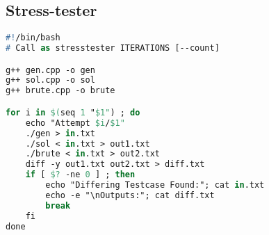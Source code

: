 \subsection*{Stress-tester}
\begin{lstlisting}[language= Pascal, commentstyle=\color{black}, numberstyle=\tiny\color{black}, keywordstyle=\color{black}, stringstyle=\color{black},
]
#!/bin/bash
# Call as stresstester ITERATIONS [--count]

g++ gen.cpp -o gen
g++ sol.cpp -o sol
g++ brute.cpp -o brute

for i in $(seq 1 "$1") ; do
    echo "Attempt $i/$1"
    ./gen > in.txt
    ./sol < in.txt > out1.txt
    ./brute < in.txt > out2.txt
    diff -y out1.txt out2.txt > diff.txt
    if [ $? -ne 0 ] ; then
        echo "Differing Testcase Found:"; cat in.txt
        echo -e "\nOutputs:"; cat diff.txt
        break
    fi
done
\end{lstlisting}
